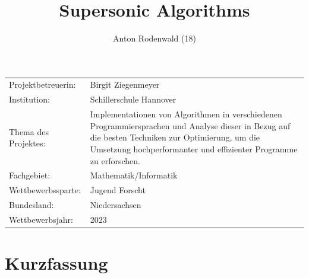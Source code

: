 \documentclass[10pt,a4paper]{article}
\begin{document}
\addtocounter{page}{-1}


\title{Supersonic Algorithms}
\author{Anton Rodenwald (18)}

\maketitle

\thispagestyle{empty}

\large\begin{tabular}{l p{12cm}}

    Projektbetreuerin: & Birgit Ziegenmeyer                                                    \\

    Institution:       & Schillerschule Hannover                                               \\

    Thema des Projektes:
                       & Implementationen von Algorithmen in verschiedenen Programmiersprachen
    und Analyse dieser in Bezug auf die besten Techniken zur Optimierung,
    um die Umsetzung hochperformanter und effizienter Programme zu erforschen.                 \\

    Fachgebiet:        & Mathematik/Informatik                                                 \\

    Wettbewerbssparte: & Jugend Forscht                                                        \\

    Bundesland:        & Niedersachsen                                                         \\

    Wettbewerbsjahr:   & 2023                                                                  \\
\end{tabular}


\clearpage


\section*{Kurzfassung}
\end{document}
